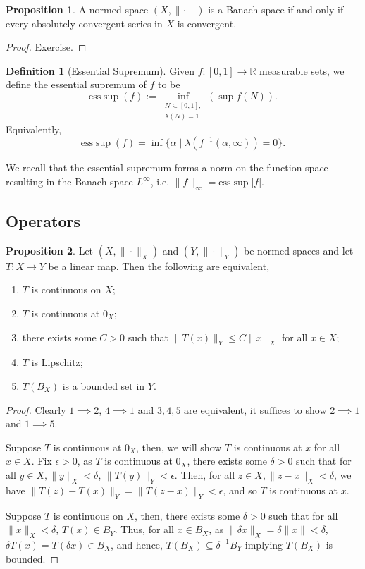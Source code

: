 \documentclass[
]{article}
\theoremstyle{definition}
\theoremstyle{definition}
\newtheorem{definition}{Definition}[section]
\newtheorem{proposition}{Proposition}[section]
\begin{document}
\begin{proposition}
  A normed space \((X, \|\cdot\|)\) is a Banach space if and only if every 
  absolutely convergent series in \(X\) is convergent. 
\end{proposition}
\begin{proof}
  Exercise.
\end{proof}

\begin{definition}[Essential Supremum]
  Given \(f : [0, 1] \to \mathbb{R}\) measurable sets, we define the essential 
  supremum of \(f\) to be 
  \[\text{ess} \sup(f) := \inf_{\substack{N \subseteq [0, 1],\\ \lambda(N) = 1}} 
    (\sup f(N)).\]
  Equivalently, 
  \[\text{ess} \sup(f) = \inf \{\alpha \mid \lambda(f^{-1}(\alpha, \infty)) = 0\}.\]
\end{definition}

We recall that the essential supremum forms a norm on the function space resulting 
in the Banach space \(L^\infty\), i.e. \(\|f\|_\infty = \text{ess} \sup |f|\).

\subsection{Operators}

\begin{proposition}
  Let \((X, \|\cdot\|_X)\) and \((Y, \|\cdot\|_Y)\) be normed spaces and let 
  \(T : X \to Y\) be a linear map. Then the following are equivalent,
  \begin{enumerate}
    \item \(T\) is continuous on \(X\);
    \item \(T\) is continuous at \(0_X\);
    \item there exists some \(C > 0\) such that \(\|T(x)\|_Y \le C \|x\|_X\) for all \(x \in X\);
    \item \(T\) is Lipschitz;
    \item \(T(B_X)\) is a bounded set in \(Y\).
  \end{enumerate}
\end{proposition}
\begin{proof}
  Clearly \(1 \implies 2\), \(4 \implies 1\) and \(3, 4, 5\) are equivalent, it 
  suffices to show \(2 \implies 1\) and \(1 \implies 5\).

  Suppose \(T\) is continuous at \(0_X\), then, we will show \(T\) is continuous 
  at \(x\) for all \(x \in X\). Fix \(\epsilon > 0\), as \(T\) is continuous at 
  \(0_X\), there exists some \(\delta > 0\) such that for all 
  \(y \in X, \|y\|_X < \delta\), \(\|T(y)\|_Y < \epsilon\). Then, for all 
  \(z \in X, \|z - x\|_X < \delta\), we have \(\|T(z) - T(x)\|_Y = 
  \|T(z - x)\|_Y < \epsilon\), and so \(T\) is continuous at \(x\).

  Suppose \(T\) is continuous on \(X\), then, there exists some \(\delta > 0\) 
  such that for all \(\|x\|_X < \delta\), \(T(x) \in B_Y\). Thus, for all 
  \(x \in B_X\), as \(\|\delta x\|_X = \delta \|x\| < \delta\), \(\delta T(x) = 
  T(\delta x) \in B_X\), and hence, \(T(B_X) \subseteq \delta^{-1} B_Y\) implying 
  \(T(B_X)\) is bounded.
\end{proof}
\end{document}
